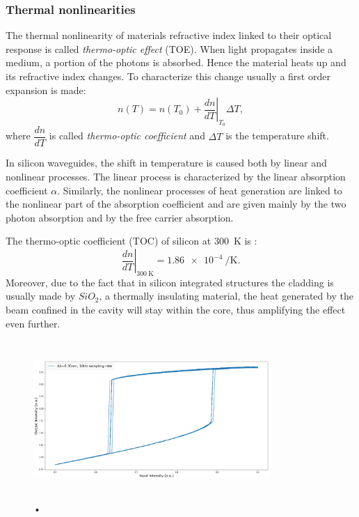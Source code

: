 \subsubsection{Thermal nonlinearities}
\label{sssec:Thermal_nonlinearities}
The thermal nonlinearity of materials refractive index linked to their optical response is called \textit{thermo-optic effect} (TOE).
When light propagates inside a medium, a portion of the photons is absorbed.
Hence the material heats up and its refractive index changes.
To characterize this change usually a first order expansion is made:
\begin{equation}
	n\left(T\right) = n\left(T_0\right) + \left.\dfrac{dn}{dT}\right|_{T_0} \Delta T,
	\label{eq:TOC}
\end{equation}
where $\dfrac{dn}{dT}$ is called \textit{thermo-optic coefficient} and $\Delta T$ is the temperature shift.

In silicon waveguides, the shift in temperature is caused both by linear and nonlinear processes.
The linear process is characterized by the linear absorption coefficient $\alpha$.
Similarly, the nonlinear processes of heat generation are linked to the nonlinear part of the absorption coefficient and are given mainly by the two photon absorption and by the free carrier absorption.

The thermo-optic coefficient (TOC) of silicon at \SI{300}{\K} is \cite{??} :
\begin{equation}
	\left.\dfrac{dn}{dT}\right|_{\SI{300}{\K}} = \SI{1.86e-4}{\per\K}.
	\label{eq:Si_TOC}
\end{equation}
Moreover, due to the fact that in silicon integrated structures the cladding is usually made by $SiO_2$, a thermally insulating material, the heat generated by the beam confined in the cavity will stay within the core, thus amplifying the effect even further.

\begin{figure}[!htbp]
	\centering
	\includegraphics[draft,width=9cm,height=6cm]{figures/foo.png}
	\caption{•}
	\label{fig:NL_effects}
\end{figure}

